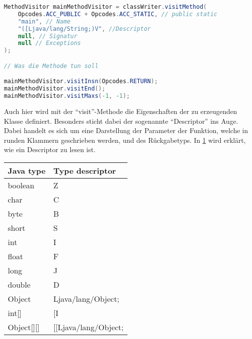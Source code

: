 \begin{lstlisting}[language=Java, caption=Definieren einer Methode, label={lst:asm-mainMethod}]
MethodVisitor mainMethodVisitor = classWriter.visitMethod(
	Opcodes.ACC_PUBLIC + Opcodes.ACC_STATIC, // public static
	"main", // Name
	"([Ljava/lang/String;)V", //Descriptor
	null, // Signatur
	null // Exceptions
);

// Was die Methode tun soll

mainMethodVisitor.visitInsn(Opcodes.RETURN);
mainMethodVisitor.visitEnd();
mainMethodVisitor.visitMaxs(-1, -1);

\end{lstlisting}

Auch hier wird mit der \enquote{visit}-Methode die Eigenschaften der zu erzeugenden Klasse definiert. Besonders sticht dabei der sogenannte \enquote{Descriptor} ins Auge. Dabei handelt es sich um eine Darstellung der Parameter der Funktion, welche in runden Klammern geschrieben werden, und des Rückgabetyps. In \cref{tab:asm-descriptor} wird erklärt, wie ein Descriptor zu lesen ist.

\begin{table}[h!]
	\centering
		\begin{tabular}{@{}ll@{}}
			\toprule
			Java type          & Type descriptor          \\ \midrule
			boolean            & Z                        \\
			char               & C                        \\
			byte               & B                        \\
			short              & S                        \\
			int                & I                        \\
			float              & F                        \\
			long               & J                        \\
			double             & D                        \\
			Object             & Ljava/lang/Object;       \\
			int{[}{]}          & {[}I                     \\
			Object{[}{]}{[}{]} & {[}{[}Ljava/lang/Object; \\ \bottomrule
		\end{tabular}%
	\label{tab:asm-descriptor}
\end{table}

